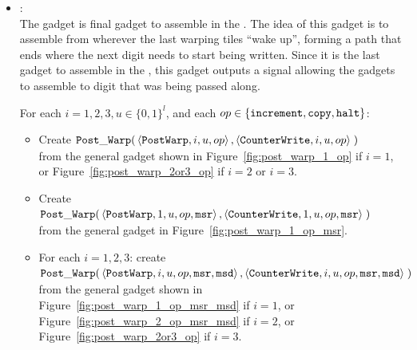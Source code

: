 \begin{itemize}
    \item {\postwarp}: \\
    The {\postwarp} gadget is final gadget to assemble in the {\warpunit}.
    The idea of this gadget is to assemble from wherever the last warping tiles ``wake up'', forming a path that ends where the next digit needs to start being written.
    Since it is the last gadget to assemble in the {\warpunit}, this gadget outputs a signal allowing the {\cwrite} gadgets to assemble to digit that was being passed along.

    For each $i = 1,2,3, u \in \{0, 1\}^l$, and each $op \in \{ {\tt increment}, {\tt copy}, {\tt halt} \}$:
    \begin{itemize}
       \item Create
        $\begin{aligned}[t]
            \postwarp(& \left \langle {\tt PostWarp},     i, u, \inc \right\rangle,    %
                        \left \langle {\tt CounterWrite}, i, u, \inc \right\rangle \;) %
        \end{aligned}$ \\
        from the general gadget shown in Figure~\ref{fig:post_warp_1_op} if $i = 1$,
        or Figure~\ref{fig:post_warp_2or3_op} if $ i = 2$ or $i = 3$.
        \vspace{.5cm}


        \item Create
        $\begin{aligned}[t]
            \postwarp(& \left \langle {\tt PostWarp},     1, u, \inc, {\tt msr} \right\rangle,    %
                        \left \langle {\tt CounterWrite}, 1, u, \inc, {\tt msr} \right\rangle \;) %
        \end{aligned}$ \\
        from the general gadget in Figure~\ref{fig:post_warp_1_op_msr}.
        \vspace{.5cm}

        \item For each $i=1,2,3$: create\\
        $\begin{aligned}[t]
            \postwarp(& \left \langle {\tt PostWarp},     i, u, \inc, {\tt msr}, {\tt msd} \right\rangle,    %
                        \left \langle {\tt CounterWrite}, i, u, \inc, {\tt msr}, {\tt msd} \right\rangle \;) %
        \end{aligned}$ \\
        from the general gadget shown in Figure~\ref{fig:post_warp_1_op_msr_msd} if $i = 1$, or
        Figure~\ref{fig:post_warp_2_op_msr_msd} if $i = 2$, or Figure~\ref{fig:post_warp_2or3_op} if $i = 3$.
        \vspace{.5cm}
    \end{itemize}


\end{itemize}
